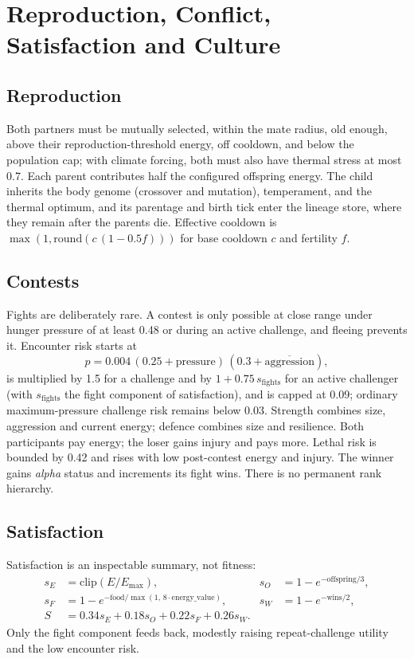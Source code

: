 \chapter{Reproduction, Conflict, Satisfaction and Culture}

\section{Reproduction}
Both partners must be mutually selected, within the mate radius, old enough,
above their reproduction-threshold energy, off cooldown, and below the population
cap; with climate forcing, both must also have thermal stress at most 0.7. Each
parent contributes half the configured offspring energy. The child inherits the
body genome (crossover and mutation), temperament, and the thermal optimum, and its
parentage and birth tick enter the lineage store, where they remain after the
parents die. Effective cooldown is $\max(1,\mathrm{round}(c\,(1-0.5f)))$ for base
cooldown $c$ and fertility $f$.

\section{Contests}
Fights are deliberately rare. A contest is only possible at close range under
hunger pressure of at least 0.48 or during an active challenge, and fleeing
prevents it. Encounter risk starts at
\[
p=0.004\,(0.25+\text{pressure})\,(0.3+\overline{\text{aggression}}),
\]
is multiplied by 1.5 for a challenge and by $1+0.75\,s_{\text{fights}}$ for an
active challenger (with $s_{\text{fights}}$ the fight component of satisfaction),
and is capped at 0.09; ordinary maximum-pressure challenge risk remains below 0.03.
Strength combines size, aggression and current energy; defence combines size and
resilience. Both participants pay energy; the loser gains injury and pays more.
Lethal risk is bounded by 0.42 and rises with low post-contest energy and injury.
The winner gains \emph{alpha} status and increments its fight wins. There is no
permanent rank hierarchy.

\section{Satisfaction}
Satisfaction is an inspectable summary, not fitness:
\begin{align*}
s_E&=\mathrm{clip}(E/E_{\max}), & s_O&=1-e^{-\text{offspring}/3},\\
s_F&=1-e^{-\text{food}/\max(1,\,8\cdot\text{energy\_value})}, & s_W&=1-e^{-\text{wins}/2},\\
S&=0.34s_E+0.18s_O+0.22s_F+0.26s_W.
\end{align*}
Only the fight component feeds back, modestly raising repeat-challenge utility and
the low encounter risk.

